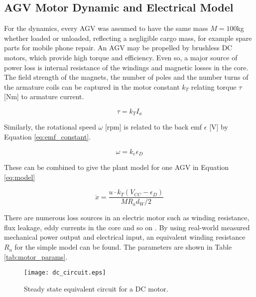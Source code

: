 \subsection{AGV Motor Dynamic and Electrical Model}
For the dynamics, every AGV was assumed to have the same mass $M=100$kg whether loaded or unloaded, reflecting a negligible cargo mass, for example spare parts for mobile phone repair. An AGV may be propelled by brushless DC motors, which provide high torque and efficiency. Even so, a major source of power loss is internal resistance of the windings and magnetic losses in the core.  %
The field strength of the magnets, the number of poles and the number turns of the armature coils can be captured in the motor constant $k_T $ relating torque $\tau$ [Nm] to armature current.

\begin{equation}
	\tau = k_T I_a
	\label{eq:torque_constant}
\end{equation} 

Similarly, the rotational speed $\omega$ [rpm] is related to the back emf $\epsilon$ [V] by Equation \ref{eq:emf_constant}.

\begin{equation}
	\omega = {k_e}\epsilon_D 
	\label{eq:emf_constant}
\end{equation}

These can be combined to give the plant model for one AGV in Equation \ref{eq:model}

\begin{equation}
	\ddot{x} =\frac{ u \cdot k_T (V_{CC} - \epsilon_D) }{M R_a d_W/2}
	\label{eq:model}
\end{equation}

There are numerous loss sources in an electric motor such as winding resistance, flux leakage, eddy currents in the core and so on \cite{Sarlioglu2016}. By using real-world measured mechanical power output and electrical input, an equivalent winding resistance $R_a$ for the simple model can be found. The parameters are shown in Table \ref{tab:motor_params}.

\begin{figure}[ht]
	\centering
	\texttt{[image: dc\_circuit.eps]}
	\caption{Steady state equivalent circuit for a DC motor.}
	\label{fig:dc_circuit}
\end{figure}


